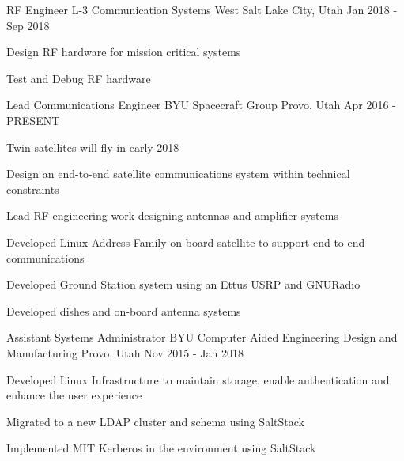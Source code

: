

\begin{cventries}
    \cventry
    {RF Engineer} %
    {L-3 Communication Systems West} %
    {Salt Lake City, Utah} %
    {Jan 2018 - Sep 2018} %
    {
        \begin{cvitems} %
        \item {Design RF hardware for mission critical systems}
        \item {Test and Debug RF hardware}
        \end{cvitems}
    }

    \cventry
    {Lead Communications Engineer} %
    {BYU Spacecraft Group} %
    {Provo, Utah} %
    {Apr 2016 - PRESENT} %
    {
        \begin{cvitems} %
        \item {Twin satellites will fly in early 2018}
        \item {Design an end-to-end satellite communications system within technical constraints}
        \item {Lead RF engineering work designing antennas and amplifier systems}
        \item {Developed Linux Address Family on-board satellite to support end to end communications}
        \item {Developed Ground Station system using an Ettus USRP and GNURadio}
        \item {Developed dishes and on-board antenna systems}
        \end{cvitems}
    }

    \cventry
    {Assistant Systems Administrator} %
    {BYU Computer Aided Engineering Design and Manufacturing} %
    {Provo, Utah} %
    {Nov 2015 - Jan 2018} %
    {
        \begin{cvitems} %
        \item {Developed Linux Infrastructure to maintain storage, enable authentication and enhance the user experience}
        \item {Migrated to a new LDAP cluster and schema using SaltStack}
        \item {Implemented MIT Kerberos in the environment using SaltStack}
        \end{cvitems}
    }


\end{cventries}
